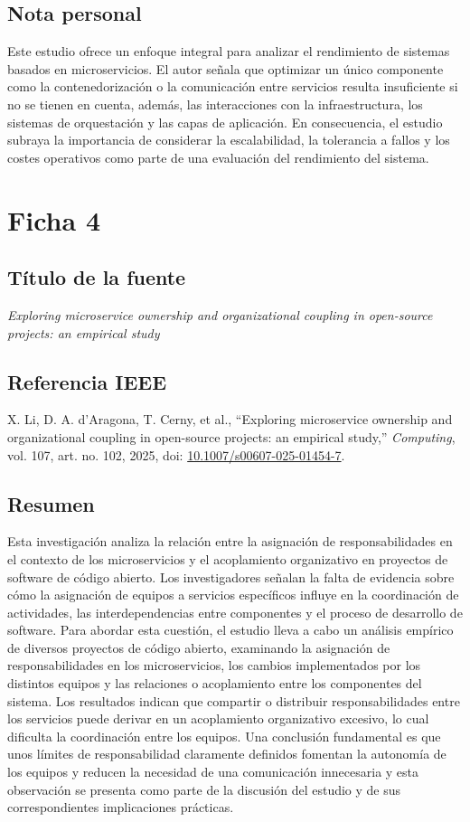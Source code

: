 \documentclass[11pt]{article}
\begin{document}
\subsection*{Nota personal}
Este estudio ofrece un enfoque integral para analizar el rendimiento de sistemas basados en microservicios. El autor señala que optimizar un único componente como la contenedorización o la comunicación entre servicios resulta insuficiente si no se tienen en cuenta, además, las interacciones con la infraestructura, los sistemas de orquestación y las capas de aplicación. En consecuencia, el estudio subraya la importancia de considerar la escalabilidad, la tolerancia a fallos y los costes operativos como parte de una evaluación del rendimiento del sistema.


\section*{Ficha 4}

\subsection*{Título de la fuente}
\textit{Exploring microservice ownership and organizational coupling in open-source projects: an empirical study}

\subsection*{Referencia IEEE}
X. Li, D. A. d’Aragona, T. Cerny, et al., ``Exploring microservice ownership and organizational coupling in open-source projects: an empirical study,'' \textit{Computing}, vol. 107, art. no. 102, 2025, doi: \href{https://doi.org/10.1007/s00607-025-01454-7}{10.1007/s00607-025-01454-7}.

\subsection*{Resumen}
Esta investigación analiza la relación entre la asignación de responsabilidades en el contexto de los microservicios y el acoplamiento organizativo en proyectos de software de código abierto. Los investigadores señalan la falta de evidencia sobre cómo la asignación de equipos a servicios específicos influye en la coordinación de actividades, las interdependencias entre componentes y el proceso de desarrollo de software. Para abordar esta cuestión, el estudio lleva a cabo un análisis empírico de diversos proyectos de código abierto, examinando la asignación de responsabilidades en los microservicios, los cambios implementados por los distintos equipos y las relaciones o acoplamiento entre los componentes del sistema. Los resultados indican que compartir o distribuir responsabilidades entre los servicios puede derivar en un acoplamiento organizativo excesivo, lo cual dificulta la coordinación entre los equipos. Una conclusión fundamental es que unos límites de responsabilidad claramente definidos fomentan la autonomía de los equipos y reducen la necesidad de una comunicación innecesaria y esta observación se presenta como parte de la discusión del estudio y de sus correspondientes implicaciones prácticas.
\end{document}
